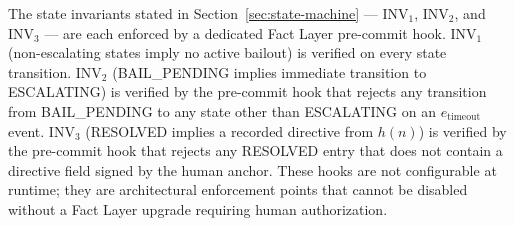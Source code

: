 The state invariants stated in Section~\ref{sec:state-machine} — INV$_1$, INV$_2$, and INV$_3$ — are each enforced by a dedicated Fact Layer pre-commit hook. INV$_1$ (non-escalating states imply no active bailout) is verified on every state transition. INV$_2$ (BAIL\_PENDING implies immediate transition to ESCALATING) is verified by the pre-commit hook that rejects any transition from BAIL\_PENDING to any state other than ESCALATING on an $e_{\text{timeout}}$ event. INV$_3$ (RESOLVED implies a recorded directive from $h(n)$) is verified by the pre-commit hook that rejects any RESOLVED entry that does not contain a directive field signed by the human anchor. These hooks are not configurable at runtime; they are architectural enforcement points that cannot be disabled without a Fact Layer upgrade requiring human authorization.
